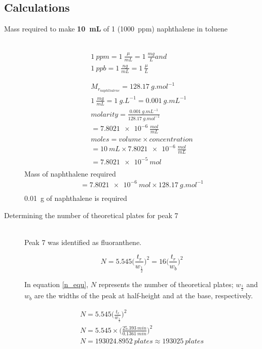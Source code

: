 \documentclass[a4paper, 12pt]{article}
\begin{document}
\subsection{Calculations}

\begin{description}
\item[Mass required to make \textbf{\SI{10}{mL}} of \SI{1}{} (\SI{1000}{ppm}) naphthalene in toluene] \hfill \\
\begin{gather*}
	\SI{1}{ppm} = \SI{1}{\frac{\mu}{mL}} = \SI{1}{\frac{mg}{L}} and \\
	\SI{1}{ppb} = \SI{1}{\frac{ng}{mL}} = \SI{1}{\frac{\mu}{L}} \\
	\\
	\\
	M_{r_{naphthalene}} = \SI{128.17}{g.mol^{-1}} \\
	\SI{1}{\frac{mg}{mL}} = \SI{1}{g.L^{-1}} = \SI{0.001}{g.mL^{-1}} \\
	molarity = \frac{\SI{0.001}{g.mL^{-1}}}{\SI{128.17}{g.mol^{-1}}} \\
	= \SI{7.8021e-6}{\frac{mol}{mL}} \\
	moles = volume \times concentration \\
	= \SI{10}{mL} \times \SI{7.8021e-6}{\frac{mol}{mL}} \\
	= \SI{7.8021e-5}{mol} \\
\end{gather*}
	Mass of naphthalene required 
\begin{gather*}
= \SI{7.8021e-6}{mol} \times \SI{128.17}{g.mol^{-1}} \\
\end{gather*}
\SI{0.01}{g} of naphthalene is required

\item[Determining the number of theoretical plates for peak 7] \hfill \\
	Peak 7 was identified as fluoranthene.

	\begin{equation} \label{n_equ}
		N = 5.545\Bigg(\frac{t_r}{w_\frac{1}{2}}\Bigg)^2 = 16\Bigg(\frac{t_r}{w_b}\Bigg)^2
	\end{equation}

	In equation \ref{n_equ}, \(N\) represents the number of theoretical plates; \(w_\frac{1}{2}\) and \(w_b\) are the widths of the peak at half-height and at the base, respectively.

	\begin{gather*}
		N = 5.545\Bigg(\frac{t_r}{w_\frac{1}{2}}\Bigg)^2 \\
		N = \num{5.545} \times \Bigg(\frac{\SI{25.393}{min}}{\SI{0.1361}{min}}\Bigg)^2 \\
		N = \SI{193024.8952}{plates} \approx \SI{193025}{plates}
	\end{gather*}


\end{description}
\end{document}
